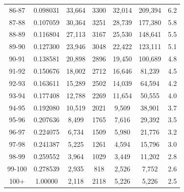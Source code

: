 \documentclass[10pt,a4paper]{article}
\begin{document}
\begin{longtable}{|c|c|c|c|c|c|c|}
86-87  & 0.098031      & 33,664       & 3300          & 32,014        & 209,394      & 6.2          \\
87-88  & 0.107059      & 30,364       & 3251          & 28,739        & 177,380      & 5.8          \\
88-89  & 0.116804      & 27,113       & 3167          & 25,530        & 148,641      & 5.5          \\
89-90  & 0.127300      & 23,946       & 3048          & 22,422        & 123,111      & 5.1          \\
90-91  & 0.138581      & 20,898       & 2896          & 19,450        & 100,689      & 4.8          \\
91-92  & 0.150676      & 18,002       & 2712          & 16,646        & 81,239       & 4.5          \\
92-93  & 0.163611      & 15,289       & 2502          & 14,039        & 64,594       & 4.2          \\
93-94  & 0.177408      & 12,788       & 2269          & 11,654        & 50,555       & 4.0          \\
94-95  & 0.192080      & 10,519       & 2021          & 9,509         & 38,901       & 3.7          \\
95-96  & 0.207636      & 8,499        & 1765          & 7,616         & 29,392       & 3.5          \\
96-97  & 0.224075      & 6,734        & 1509          & 5,980         & 21,776       & 3.2          \\
97-98  & 0.241387      & 5,225        & 1261          & 4,594         & 15,796       & 3.0          \\
98-99  & 0.259552      & 3,964        & 1029          & 3,449         & 11,202       & 2.8          \\
99-100 & 0.278539      & 2,935        & 818           & 2,526         & 7,752        & 2.6          \\
100+   & 1.00000       & 2,118        & 2118          & 5,226         & 5,226        & 2.5          
\hline 
\label{LifeTable}
\end{longtable}

\addappheadtotoc
\end{document}
